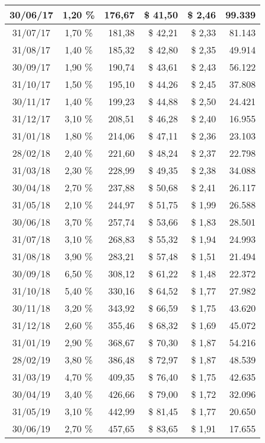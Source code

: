 \begin{center}
\begin{longtable}{|c|c|r|r|r|r|}
30/06/17 & 1,20 \% & 176,67 & \$ 41,50 & \$ 2,46 & 99.339 \\ \hline
31/07/17 & 1,70 \% & 181,38 & \$ 42,21 & \$ 2,33 & 81.143 \\ \hline
31/08/17 & 1,40 \% & 185,32 & \$ 42,80 & \$ 2,35 & 49.914 \\ \hline
30/09/17 & 1,90 \% & 190,74 & \$ 43,61 & \$ 2,43 & 56.122 \\ \hline
31/10/17 & 1,50 \% & 195,10 & \$ 44,26 & \$ 2,45 & 37.808 \\ \hline
30/11/17 & 1,40 \% & 199,23 & \$ 44,88 & \$ 2,50 & 24.421 \\ \hline
31/12/17 & 3,10 \% & 208,51 & \$ 46,28 & \$ 2,40 & 16.955 \\ \hline
31/01/18 & 1,80 \% & 214,06 & \$ 47,11 & \$ 2,36 & 23.103 \\ \hline
28/02/18 & 2,40 \% & 221,60 & \$ 48,24 & \$ 2,37 & 22.798 \\ \hline
31/03/18 & 2,30 \% & 228,99 & \$ 49,35 & \$ 2,38 & 34.088 \\ \hline
30/04/18 & 2,70 \% & 237,88 & \$ 50,68 & \$ 2,41 & 26.117 \\ \hline
31/05/18 & 2,10 \% & 244,97 & \$ 51,75 & \$ 1,99 & 26.588 \\ \hline
30/06/18 & 3,70 \% & 257,74 & \$ 53,66 & \$ 1,83 & 28.501 \\ \hline
31/07/18 & 3,10 \% & 268,83 & \$ 55,32 & \$ 1,94 & 24.993 \\ \hline
31/08/18 & 3,90 \% & 283,21 & \$ 57,48 & \$ 1,51 & 21.494 \\ \hline
30/09/18 & 6,50 \% & 308,12 & \$ 61,22 & \$ 1,48 & 22.372 \\ \hline
31/10/18 & 5,40 \% & 330,16 & \$ 64,52 & \$ 1,77 & 27.982 \\ \hline
30/11/18 & 3,20 \% & 343,92 & \$ 66,59 & \$ 1,75 & 43.620 \\ \hline
31/12/18 & 2,60 \% & 355,46 & \$ 68,32 & \$ 1,69 & 45.072 \\ \hline
31/01/19 & 2,90 \% & 368,67 & \$ 70,30 & \$ 1,87 & 54.216 \\ \hline
28/02/19 & 3,80 \% & 386,48 & \$ 72,97 & \$ 1,87 & 48.539 \\ \hline
31/03/19 & 4,70 \% & 409,35 & \$ 76,40 & \$ 1,75 & 42.635 \\ \hline
30/04/19 & 3,40 \% & 426,66 & \$ 79,00 & \$ 1,72 & 32.096 \\ \hline
31/05/19 & 3,10 \% & 442,99 & \$ 81,45 & \$ 1,77 & 20.650 \\ \hline
30/06/19 & 2,70 \% & 457,65 & \$ 83,65 & \$ 1,91 & 17.655 \\ \hline

\end{longtable}
\end{center}
